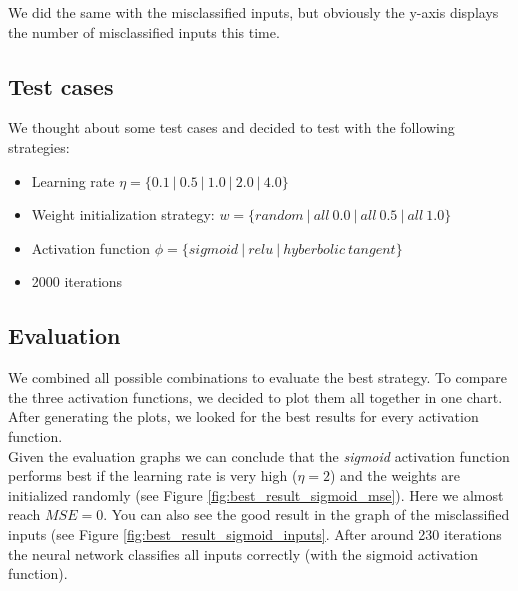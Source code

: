 \documentclass{article}
\begin{document}
We did the same with the misclassified inputs, but obviously the y-axis displays the number of misclassified inputs this time.

\subsection{Test cases}

We thought about some test cases and decided to test with the following strategies:

\begin{itemize}
\item{Learning rate $\eta = \{0.1\ |\ 0.5\ |\ 1.0\ |\ 2.0\ |\ 4.0 \}$}
\item{Weight initialization strategy: $w = \{ random\ |\ all\ 0.0\ |\ all\ 0.5\ |\ all\ 1.0\}$}
\item{Activation function $\phi = \{sigmoid\ |\ relu\ |\ hyberbolic\ tangent\}$}
\item{2000 iterations}
\end{itemize}

\subsection{Evaluation}
We combined all possible combinations to evaluate the best strategy.
To compare the three activation functions, we decided to plot them all together in one chart.
After generating the plots, we looked for the best results for every activation function.
\\

Given the evaluation graphs we can conclude that the \emph{sigmoid} activation function performs best if the learning rate is very high ($\eta = 2$) and the weights are initialized randomly (see Figure \ref{fig:best_result_sigmoid_mse}).  Here we almost reach $MSE = 0$. You can also see the good result in the graph of the misclassified inputs (see Figure \ref{fig:best_result_sigmoid_inputs}. After around 230 iterations the neural network classifies all inputs correctly (with the sigmoid activation function).
\end{document}
